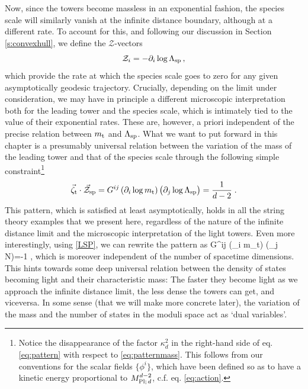Now, since the towers become massless in an exponential fashion, the species scale will similarly vanish at the infinite distance boundary, although at a different rate. To account for this, and following our discussion in Section \ref{s:convexhull}, we define the $\mathcal{Z} $-vectors
%
\begin{equation}\label{eq:speciescalechargetomass}
	\mathcal{Z}_i = -\partial_i \log \Lambda_{\text{sp}}\, ,
\end{equation}
%
which provide the rate at which the species scale goes to zero for any given asymptotically geodesic trajectory. Crucially, depending on the limit under consideration, we may have in principle a different microscopic interpretation both for the leading tower and the species scale, which is intimately tied to the value of their exponential rates. These are, however, a priori independent of the precise relation between $m_{\rm t}$ and $\Lambda_{\text{sp}}$. What we want to put forward in this chapter is a presumably universal relation between the variation of the mass of the leading tower and that of the species scale through the following simple constraint\footnote{Notice the disappearance of the factor $\kappa_d^2$ in the right-hand side of eq. \eqref{eq:pattern} with respect to \eqref{eq:patternmass}. This follows from our conventions for the scalar fields $\{ \phi^i\}$, which have been defined so as to have a kinetic energy proportional to $M_{\text{Pl;}\, d}^{d-2}$, c.f. eq. \eqref{eq:action}.}
%
\begin{equation}\label{eq:pattern}
	\vec{\zeta}_{\rm t} \cdot \vec{\mathcal{Z}}_{\text{sp}} = G^{ij} \left(\partial_i \log m_{\rm t}\right) \left(\partial_j \log \Lambda_{\text{sp}}\right)= \frac{1}{d-2}\; .
\end{equation}
%
This pattern, which is satisfied at least asymptotically, holds in all the string theory examples that we present here, regardless of the nature of the infinite distance limit and the microscopic interpretation of the light towers. %
Even more interestingly, using \eqref{LSP}, we can rewrite the pattern as
%
\beq\label{eq:patternN}
	G^{ij} \left(\partial_i \log m_{\rm t}\right) \left(\partial_j \log N\right)=-1\; ,
\eeq
%
which is moreover independent of the number of spacetime dimensions. This hints towards some deep universal relation between the density of states becoming light and their characteristic mass: The faster they become light as we approach the infinite distance limit, the less dense the towers can get, and viceversa. In some sense (that we will make more concrete later),  the variation of the mass and the number of states in the moduli space act as `dual variables'.

